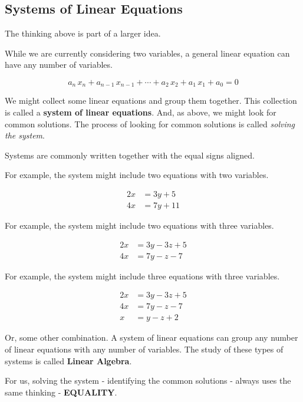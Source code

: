 \documentclass{ximera}
\begin{document}
\subsection*{Systems of Linear Equations}

The thinking above is part of a larger idea.


While we are currently considering two variables, a general linear equation can have any number of variables.


\[
a_n \, x_n + a_{n-1} \, x_{n-1} + \cdots + a_2 \, x_2 + a_1 \, x_1 + a_0 = 0
\]


We might collect some linear equations and group them together. This collection is called a \textbf{system of linear equations}. And, as above, we might look for common solutions.  The process of looking for common solutions is called \textit{solving the system}.





Systems are commonly written together with the equal signs aligned.

For example, the system might include two equations with two variables.

\begin{align*}
2x & = 3y + 5 \\
4x & = 7y + 11
\end{align*}



For example, the system might include two equations with three variables.

\begin{align*}
2x & = 3y - 3z + 5 \\
4x & = 7y - z - 7
\end{align*}




For example, the system might include three equations with three variables.

\begin{align*}
2x & = 3y - 3z + 5 \\
4x & = 7y - z - 7 \\
x & = y - z + 2 
\end{align*}


Or, some other combination. A system of linear equations can group any number of linear equations with any number of variables.  The study of these types of systems is called \textbf{Linear Algebra}.

For us, solving the system - identifying the common solutions - always uses the same thinking - \textbf{\textcolor{purple!85!blue}{EQUALITY}}.
\end{document}
